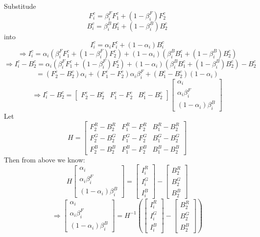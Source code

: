 \documentclass[11pt,letterpaper]{article}
\begin{document}
Substitude 
$$F_i^c = \beta^F_{i} F_1^c + (1-\beta^F_{i})F_2^c$$
$$B_i^c = \beta^B_{i} B_1^c + (1-\beta^B_{i})B_2^c$$
into 
$$I_i^c = \alpha_i F_i^c + (1-\alpha_i)B_i^c$$
$$\Rightarrow I_i^c = \alpha_i (\beta^F_{i} F_1^c + (1-\beta^F_{i})F_2^c) + (1-\alpha_i)(\beta^B_{i} B_1^c + (1-\beta^B_{i})B_2^c)$$
$$\Rightarrow I_i^c - B_2^c = \alpha_i (\beta^F_{i} F_1^c + (1-\beta^F_{i})F_2^c) + (1-\alpha_i)(\beta^B_{i} B_1^c + (1-\beta^B_{i})B_2^c) - B_2^c$$
$$ = (F_2^c - B_2^c)\alpha_i + (F_1^c - F_2^c)\alpha_i \beta_i^F + (B_1^c - B_2^c)(1-\alpha_i)$$
$$ \Rightarrow I_i^c - B_2^c = 
  \begin{bmatrix}
    F_2^c - B_2^c & F_1^c - F_2^c & B_1^c - B_2^c
  \end{bmatrix}
  \begin{bmatrix}
    \alpha_i \\ \alpha_i \beta_i^F \\ (1-\alpha_i)\beta_i^B
  \end{bmatrix} $$
Let $$H = \begin{bmatrix}
    F_2^R - B_2^R & F_1^R - F_2^R & B_1^R - B_2^R \\
    F_2^G - B_2^G & F_1^G - F_2^G & B_1^G - B_2^G \\
    F_2^B - B_2^B & F_1^B - F_2^B & B_1^B - B_2^B 
  \end{bmatrix}$$
Then from above we know:
$$H\begin{bmatrix}
    \alpha_i \\ \alpha_i \beta_i^F \\ (1-\alpha_i)\beta_i^B
  \end{bmatrix} = 
  \begin{bmatrix}
    I_i^R \\ I_i^G \\ I_i^B
  \end{bmatrix} - 
  \begin{bmatrix}
    B_2^R \\ B_2^G \\ B_2^B
  \end{bmatrix}$$
$$\Rightarrow \begin{bmatrix}
    \alpha_i \\ \alpha_i \beta_i^F \\ (1-\alpha_i)\beta_i^B
  \end{bmatrix} = H^{-1}(
  \begin{bmatrix}
    I_i^R \\ I_i^G \\ I_i^B
  \end{bmatrix} - 
  \begin{bmatrix}
    B_2^R \\ B_2^G \\ B_2^B
  \end{bmatrix})$$
\end{document}

